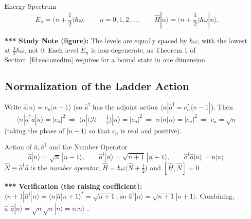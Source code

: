 \documentclass[11pt,a4paper]{article}
\begin{document}
\begin{thm}{Energy Spectrum}
\[
E_n=\Big(n+\frac12\Big)\hbar\omega,\qquad n=0,1,2,\dots,\qquad
\hat H|n\rangle=\Big(n+\frac12\Big)\hbar\omega|n\rangle .
\]
\end{thm}
\begin{center}
\end{center}
\textbf{*** Study Note (figure):} The levels are equally spaced by $\hbar\omega$, with the lowest at $\frac12\hbar\omega$, not $0$. Each level $E_n$ is non-degenerate, as Theorem 1 of Section~\ref{fd:sec:onedim} requires for a bound state in one dimension.

\subsection{Normalization of the Ladder Action}
Write $\hat a|n\rangle=c_n|n-1\rangle$ (so $\hat a^\dagger$ has the adjoint action $\langle n|\hat a^\dagger=c_n^*\langle n-1|$). Then
\[
\langle n|\hat a^\dagger\hat a|n\rangle=|c_n|^2\ \Rightarrow\ \langle n|\big(\hat{\mathcal H}-\tfrac12\big)|n\rangle=|c_n|^2\ \Rightarrow\ n\langle n|n\rangle=|c_n|^2\ \Rightarrow\ c_n=\sqrt n
\]
(taking the phase of $|n-1\rangle$ so that $c_n$ is real and positive).
\begin{thm}{Action of $\hat a,\hat a^\dagger$ and the Number Operator}
\[
\hat a|n\rangle=\sqrt n\,|n-1\rangle,\qquad \hat a^\dagger|n\rangle=\sqrt{n+1}\,|n+1\rangle,\qquad
\hat a^\dagger\hat a|n\rangle=n|n\rangle .
\]
$\hat N\equiv\hat a^\dagger\hat a$ is the \emph{number operator}, $\hat H=\hbar\omega\big(\hat N+\frac12\big)$ and $[\hat H,\hat N]=0$.
\end{thm}
\textbf{*** Verification (the raising coefficient):} $\langle n+1|\hat a^\dagger|n\rangle=\langle n|\hat a|n+1\rangle^*=\sqrt{n+1}$, so $\hat a^\dagger|n\rangle=\sqrt{n+1}|n+1\rangle$. Combining, $\hat a^\dagger\hat a|n\rangle=\sqrt n\sqrt n|n\rangle=n|n\rangle$ \checkmark.
\end{document}
